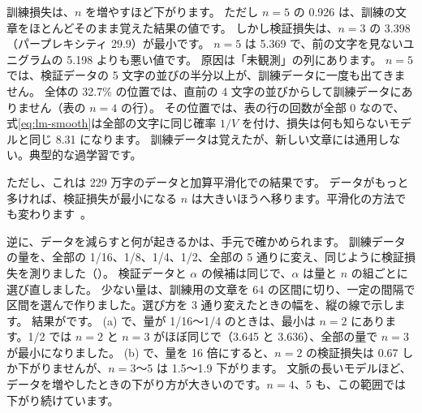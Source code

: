 訓練損失は、$n$ を増やすほど下がります。
ただし $n=5$ の 0.926 は、訓練の文章をほとんどそのまま覚えた結果の値です。
しかし検証損失は、$n=3$ の 3.398（パープレキシティ 29.9）が最小です。
$n=5$ は 5.369 で、前の文字を見ないユニグラムの 5.198 よりも悪い値です。
原因は「未観測」の列にあります。
$n=5$ では、検証データの 5 文字の並びの半分以上が、訓練データに一度も出てきません。
全体の 32.7\% の位置では、直前の 4 文字の並びからして訓練データにありません（表の $n=4$ の行）。
その位置では、表の行の回数が全部 0 なので、式\eqref{eq:lm-smooth}は全部の文字に同じ確率 $1/V$ を付け、損失は何も知らないモデルと同じ 8.31 になります。
訓練データは覚えたが、新しい文章には通用しない。典型的な過学習です。

ただし、これは 229 万字のデータと加算平滑化での結果です。
データがもっと多ければ、検証損失が最小になる $n$ は大きいほうへ移ります。平滑化の方法でも変わります~\cite{jurafsky2025slp}。

逆に、データを減らすと何が起きるかは、手元で確かめられます。
訓練データの量を、全部の 1/16、1/8、1/4、1/2、全部の 5 通りに変え、同じように検証損失を測りました（）。
検証データと $\alpha$ の候補は同じで、$\alpha$ は量と $n$ の組ごとに選び直しました。
少ない量は、訓練用の文章を 64 の区間に切り、一定の間隔で区間を選んで作りました。選び方を 3 通り変えたときの幅を、縦の線で示します。
結果がです。
(a) で、量が 1/16〜1/4 のときは、最小は $n=2$ にあります。1/2 では $n=2$ と $n=3$ がほぼ同じで（3.645 と 3.636）、全部の量で $n=3$ が最小になりました。
(b) で、量を 16 倍にすると、$n=2$ の検証損失は 0.67 しか下がりませんが、$n=3$〜5 は 1.5〜1.9 下がります。
文脈の長いモデルほど、データを増やしたときの下がり方が大きいのです。$n=4$、5 も、この範囲では下がり続けています。

